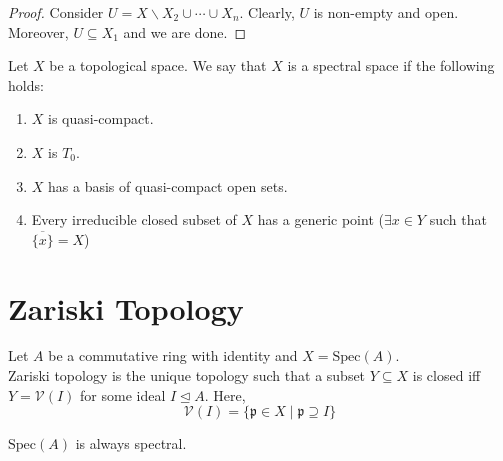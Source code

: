 \documentclass[oneside, 12pt]{scrbook}
\newcommand{\V}{\mathcal{V}}
\newcommand{\spec}{\mathrm{Spec}}
\newcommand{\pr}{\mathfrak{p}}
\theoremstyle{theorem}
\begin{document}
\begin{proof}
Consider $U = X \backslash X_{2} \cup \cdots \cup X_{n}$. Clearly, $U$ is non-empty and open. Moreover, $U \subseteq X_{1}$ and we are done. 
\end{proof}

\begin{definition}
Let $X$ be a topological space. We say that $X$ is a spectral space if the following holds: 
\begin{enumerate}
\item $X$ is quasi-compact.
\item $X$ is $T_{0}$.
\item $X$ has a basis of quasi-compact open sets.
\item Every irreducible closed subset of $X$ has a generic point ($\exists x \in Y$ such that $\overline{\{x\}}  = X$)
\end{enumerate}
\end{definition}

\section{Zariski Topology}
Let $A$ be a commutative ring with identity and $X = \spec(A)$. \\

Zariski topology is the unique topology such that a subset $Y\subseteq X$ is closed iff $Y = \V (I)$ for some ideal $I \unlhd A$. Here, $$\V(I) = \{\pr \in X \mid \pr \supseteq I\}$$

\begin{theorem}
$\spec(A)$ is always spectral.
\end{theorem}
\end{document}
